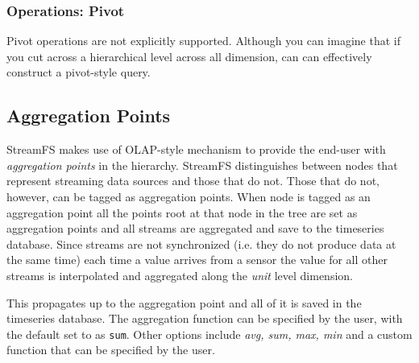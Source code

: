 

\subsubsection{Operations: Pivot}
Pivot operations are not explicitly supported.  Although you can imagine that if you cut across a hierarchical level across all dimension, can
can effectively construct a pivot-style query.



\subsection{Aggregation Points}
\label{sec:aggpts}
StreamFS makes use of OLAP-style mechanism to provide the end-user with \emph{aggregation points} in the hierarchy.
StreamFS distinguishes between nodes that represent streaming data sources and those that do not.  Those that do not, 
however, can be tagged as aggregation points.  
When node is tagged as an aggregation point all the points root at that
node in the tree are set as aggregation points and all streams are aggregated and save to the timeseries database.
Since streams are not synchronized (i.e. they do not produce data at the same time) each time a value arrives from a
sensor the value for all other streams is interpolated and aggregated along the \emph{unit} level dimension.

This propagates up to the aggregation point and all of it is saved in the timeseries database.  The aggregation function
can be specified by the user, with the default set to as \texttt{sum}.  Other options include \emph{avg, sum, max, min} and
a custom function that can be specified by the user. %

